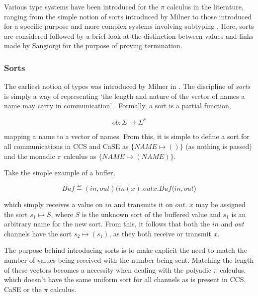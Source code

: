 Various type systems have been introduced for the $\pi$ calculus in
the literature, ranging from the simple notion of sorts introduced by
Milner \cite{milner:pi} to those introduced for a specific purpose
\cite{sangiorgi:types-or} and more complex systems involving subtyping
\cite{sangiorgi:typing}.  Here, sorts are considered followed by a
brief look at the distinction between values and links made by
Sangiorgi \cite{sangiorgi:types-or} for the purpose of proving
termination.

\subsubsection{Sorts}
\label{sorts}

The earliest notion of types was introduced by Milner in
\cite{milner:93polyadic, milner:pi}.  The discipline of \emph{sorts}
is simply a way of representing `the length and nature of the vector
of names a name may carry in communication' \cite{milner:93polyadic}.
Formally, a sort is a partial function,

\begin{equation}
ob : \Sigma \rightarrow \Sigma^*
\end{equation}

\noindent mapping a name to a vector of names.  From this, it is
simple to define a sort for all communications in CCS and CaSE as
$\{NAME \mapsto ()\}$ (as nothing is passed) and the monadic $\pi$
calculus as $\{NAME \mapsto (NAME)\}$.

Take the simple example of a buffer,

\begin{equation}
  Buf \eqdef (in,out)(in(x).\overline{out}x.Buf\langle in,
  out\rangle 
\end{equation}

\noindent which simply receives a value on $in$ and transmits it on
$out$.  $x$ may be assigned the sort $s_1 \mapsto S$, where $S$ is the
unknown sort of the buffered value and $s_1$ is an arbitrary name for
the new sort.  From this, it follows that both the $in$ and $out$
channels have the sort $s_2 \mapsto (s_1)$, as they both receive or
transmit $x$.

The purpose behind introducing sorts is to make explicit the need to
match the number of values being received with the number being sent.
Matching the length of these vectors becomes a necessity when dealing
with the polyadic $\pi$ calculus, which doesn't have the same uniform
sort for all channels as is present in CCS, CaSE or the $\pi$
calculus.

